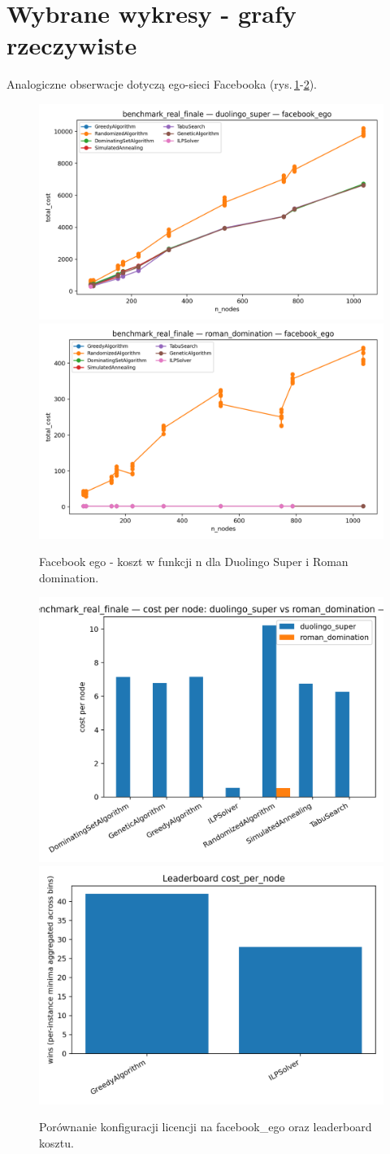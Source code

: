 \section{Wybrane wykresy - grafy rzeczywiste}
Analogiczne obserwacje dotyczą ego-sieci Facebooka (rys.\,\ref{fig:facebook_ego_cost}-\ref{fig:facebook_compare_cost}).

\begin{figure}[h]
  \centering
  \includegraphics[width=0.48\linewidth]{assets/figures/br_facebook_ego_duo_cost_vs_n.png}
  \includegraphics[width=0.48\linewidth]{assets/figures/br_facebook_ego_roman_cost_vs_n.png}
  \caption{Facebook ego - koszt w funkcji n dla Duolingo Super i Roman domination.}
  \label{fig:facebook_ego_cost}
\end{figure}

\begin{figure}[h]
  \centering
  \includegraphics[width=0.48\linewidth]{assets/figures/br_compare_cost_duo_vs_roman_facebook_ego.png}
  \includegraphics[width=0.48\linewidth]{assets/figures/br_leaderboard_cost.png}
  \caption{Porównanie konfiguracji licencji na facebook\_ego oraz leaderboard kosztu.}
  \label{fig:facebook_compare_cost}
\end{figure}

